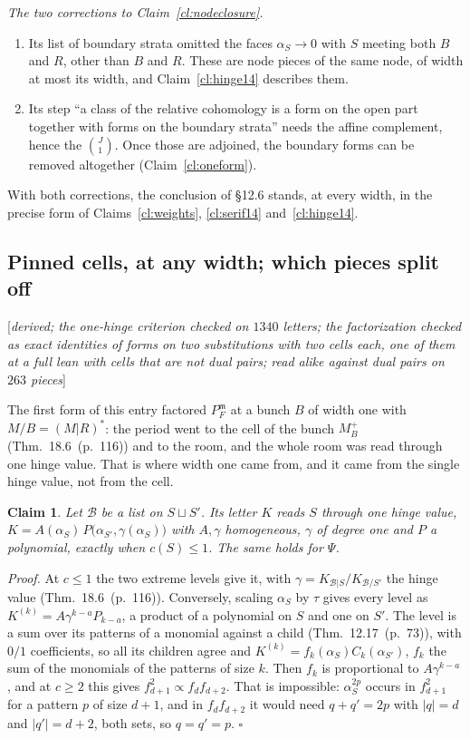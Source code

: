 \documentclass[11pt]{article}
\newcommand{\cB}{\mathcal B}
\newcommand{\status}[1]{\hfill{\small[\textit{#1}]}}
\newcommand{\hb}[2]{#1~(p.~#2)}   %
\theoremstyle{plain}
\newtheorem{claim}{Claim}[section]
\theoremstyle{remark}
\begin{document}
\emph{The two corrections to Claim~\ref{cl:nodeclosure}.}
\begin{enumerate}[label=(\arabic*)]
\item Its list of boundary strata omitted the faces $\alpha_S\to0$ with $S$ meeting both $B$ and $R$, other than $B$ and $R$. These are node pieces of the same node, of width at most its width, and Claim~\ref{cl:hinge14} describes them.
\item Its step ``a class of the relative cohomology is a form on the open part together with forms on the boundary strata'' needs the affine complement, hence the $\binom J1$. Once those are adjoined, the boundary forms can be removed altogether (Claim~\ref{cl:oneform}).
\end{enumerate}
With both corrections, the conclusion of \S12.6 stands, at every width, in the precise form of Claims~\ref{cl:weights}, \ref{cl:serif14} and~\ref{cl:hinge14}.

\subsection{Pinned cells, at any width; which pieces split off}\status{derived; the one-hinge criterion checked on $1340$ letters; the factorization checked as exact identities of forms on two substitutions with two cells each, one of them at a full lean with cells that are not dual pairs; read alike against dual pairs on $263$ pieces}

The first form of this entry factored $P_F^{\mathfrak m}$ at a bunch $B$ of width one with $M/B=(M|R)^\ast$: the period went to the cell of the bunch $M^+_B$ (Thm.~\hb{18.6}{116}) and to the room, and the whole room was read through one hinge value. That is where width one came from, and it came from the single hinge value, not from the cell.

\begin{claim}\label{cl:onehinge14}
Let $\cB$ be a list on $S\sqcup S'$. Its letter $K$ reads $S$ through one hinge value, $K=A(\alpha_S)\,P\big(\alpha_{S'},\gamma(\alpha_S)\big)$ with $A,\gamma$ homogeneous, $\gamma$ of degree one and $P$ a polynomial, exactly when $c(S)\le1$. The same holds for $\Psi$.
\end{claim}

\emph{Proof.} At $c\le1$ the two extreme levels give it, with $\gamma=K_{\cB|S}/K_{\cB/S'}$ the hinge value (Thm.~\hb{18.6}{116}). Conversely, scaling $\alpha_S$ by $\tau$ gives every level as $K^{(k)}=A\gamma^{k-a}P_{k-a}$, a product of a polynomial on $S$ and one on $S'$. The level is a sum over its patterns of a monomial against a child (Thm.~\hb{12.17}{73}), with $0/1$ coefficients, so all its children agree and $K^{(k)}=f_k(\alpha_S)C_k(\alpha_{S'})$, $f_k$ the sum of the monomials of the patterns of size $k$. Then $f_k$ is proportional to $A\gamma^{k-a}$, and at $c\ge2$ this gives $f_{d+1}^2\propto f_df_{d+2}$. That is impossible: $\alpha_S^{2p}$ occurs in $f_{d+1}^2$ for a pattern $p$ of size $d+1$, and in $f_df_{d+2}$ it would need $q+q'=2p$ with $|q|=d$ and $|q'|=d+2$, both sets, so $q=q'=p$. $\square$
\end{document}
